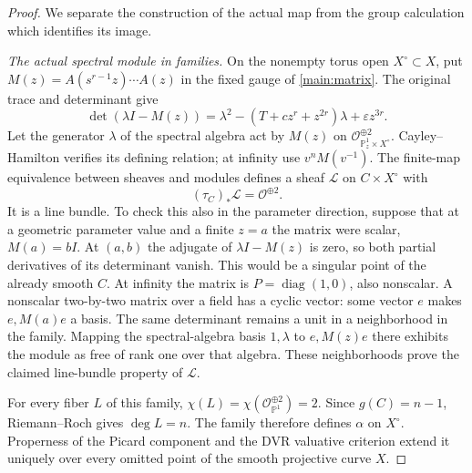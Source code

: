 \begin{proof}
We separate the construction of the actual map from the group
calculation which identifies its image.

\emph{The actual spectral module in families.}
On the nonempty torus open $X^\circ\subset X$, put
$M(z)=A(s^{r-1}z)\cdots A(z)$ in the fixed gauge of
\eqref{main:matrix}.  The original trace and determinant give
\[
\det(\lambda I-M(z))
=\lambda^2-(T+cz^r+z^{2r})\lambda+\varepsilon z^{3r}.
\]
Let the generator $\lambda$ of the spectral algebra act by $M(z)$
on $\mathcal O_{\mathbb P^1_z\times X^\circ}^{\oplus2}$.
Cayley--Hamilton verifies its defining relation; at infinity use
$v^nM(v^{-1})$.  The finite-map equivalence between sheaves and
modules defines a sheaf $\mathcal L$ on $C\times X^\circ$ with
\begin{equation}
(\tau_C)_*\mathcal L=\mathcal O^{\oplus2}.
\label{spec:module-pushdown}
\end{equation}
It is a line bundle.  To check this also in the parameter direction,
suppose that at a geometric parameter value and a finite $z=a$ the
matrix were scalar, $M(a)=bI$.  At $(a,b)$ the adjugate of
$\lambda I-M(z)$ is zero, so both partial derivatives of its
determinant vanish.  This would be a singular point of the already
smooth $C$.  At infinity the matrix is
$P=\operatorname{diag}(1,0)$, also nonscalar.  A nonscalar
two-by-two matrix over a field has a cyclic vector: some vector $e$
makes $e,M(a)e$ a basis.  The same determinant remains a unit in a
neighborhood in the family.  Mapping the spectral-algebra basis
$1,\lambda$ to $e,M(z)e$ there exhibits the module as free of
rank one over that algebra.  These neighborhoods prove the claimed
line-bundle property of $\mathcal L$.

For every fiber $L$ of this family,
$\chi(L)=\chi(\mathcal O^{\oplus2}_{\mathbb P^1})=2$.
Since $g(C)=n-1$, Riemann--Roch gives $\deg L=n$.  The family
therefore defines $\alpha$ on $X^\circ$.  Properness of the Picard
component and the DVR valuative criterion extend it uniquely over
every omitted point of the smooth projective curve $X$.


\end{proof}
